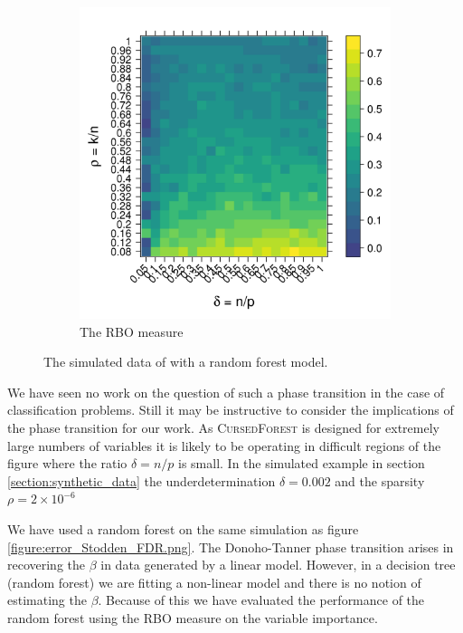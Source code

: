 \documentclass[10pt,letterpaper]{article}
\newcommand{\cursedforest}{\textsc{CursedForest}\xspace}
\begin{document}
\begin{figure}[tbhp]
\begin{subfigure}[t]{0.5\linewidth}
       \includegraphics[totalheight=6cm]{./figs/ranger_rbo_Stodden_simulation.png}
       \caption{The RBO measure}
       \label{figure:ranger_rbo_Stodden_simulation.png}
     \end{subfigure} 
     \caption{The simulated data of  with a random forest model.}
     \label{figure:ranger_rbo_Stodden_simulation.png}
 \end{figure}


We have seen no work on the question of such a phase transition in the case of classification problems. Still it may be
instructive to consider the implications of the phase transition for our work. As \cursedforest is designed for
extremely large numbers of variables it is likely to be operating in difficult regions of the figure where the ratio
$\delta = n/p$ is small. In the simulated example in section \ref{section:synthetic_data} the underdetermination $\delta = 0.002$ and the
sparsity $\rho =2\times 10^{-6}$

We have used a random forest on the same simulation as figure \ref{figure:error_Stodden_FDR.png}.  The Donoho-Tanner phase transition arises in
recovering the $\beta$ in data generated by a linear model. However, in a decision tree (random forest) we are fitting a
non-linear model and there is no notion of estimating the $\beta$. Because of this we have evaluated the performance of
the random forest using the RBO measure on the variable importance.
\end{document}
